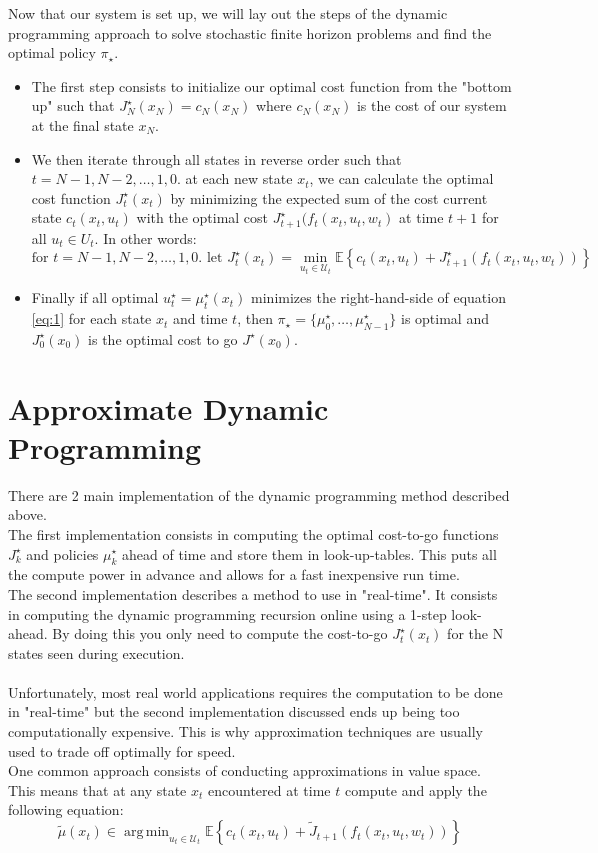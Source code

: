 \documentclass{article}[12pt]
\def\E{\mathbb{E}}
\DeclareMathOperator*{\argmin}{arg\,min}
\def \E{\mathbb E}
\begin{document}
Now that our system is set up, we will lay out the steps of the dynamic programming approach to solve stochastic finite horizon problems and find the optimal policy $\pi_\star$.\newline
\begin{itemize}
    \item The first step consists to initialize our optimal cost function from the "bottom up" such that $J^\star_N(x_N)=c_N(x_N)$ where $c_N(x_N)$ is the cost of our system at the final state $x_N$.
    \item We then iterate through all states in reverse order such that $t=N-1,N-2,\dots,1,0$. at each new state $x_t$, we can calculate the optimal cost function $J_t^\star(x_t)$ by minimizing the expected sum of the cost current state $c_t(x_t,u_t)$ with the optimal cost $J^\star_{t+1}(f_t(x_t,u_t,w_t)$ at time $t+1$ for all $u_t \in U_t$. In other words:
    \begin{equation} \label{eq:1}
        \text{for } t=N-1,N-2,\dots,1,0. \text{ let } J_t^\star(x_t)=\min_{u_t\in\mathcal U_t}\E\left\{c_t(x_t,u_t)+J^\star_{t+1}(f_t(x_t,u_t,w_t))\right\}
    \end{equation}
    \item Finally if all optimal $u_t^\star=\mu^\star_t(x_t)$ minimizes the right-hand-side of equation \eqref{eq:1} for each state $x_t$ and time $t$, then $\pi_\star=\{\mu_0^\star,\dots,\mu_{N-1}^\star\}$ is optimal and $J_0^\star(x_0)$ is the optimal cost to go $J^\star(x_0)$.
\end{itemize}

\newpage
\section{Approximate Dynamic Programming}
There are 2 main implementation of the dynamic programming method described above. \\
The first implementation consists in computing the  optimal cost-to-go functions $J_k^\star$ and policies $\mu_k^\star$ ahead of time and store them in look-up-tables. This puts all the compute power in advance and allows for a fast inexpensive run time. \\
The second implementation describes a method to use in "real-time". It consists in computing the dynamic programming recursion online using a 1-step look-ahead. By doing this you only need to compute the cost-to-go $J_t^\star(x_t)$ for the N states seen during execution.\\
\\
Unfortunately, most real world applications requires the computation to be done in "real-time" but the second implementation discussed ends up being too computationally expensive. This is why approximation techniques are usually used to trade off optimally for speed. \\
One common approach consists of conducting approximations in value space. This means that at any state $x_t$ encountered at time $t$ compute and apply the following equation:
\[
\tilde\mu(x_t) \in \argmin_{u_t \in \mathcal U_t} \E\left\{c_t(x_t,u_t)+\tilde{J}_{t+1}(f_t(x_t,u_t,w_t))\right\}
\]
\end{document}
